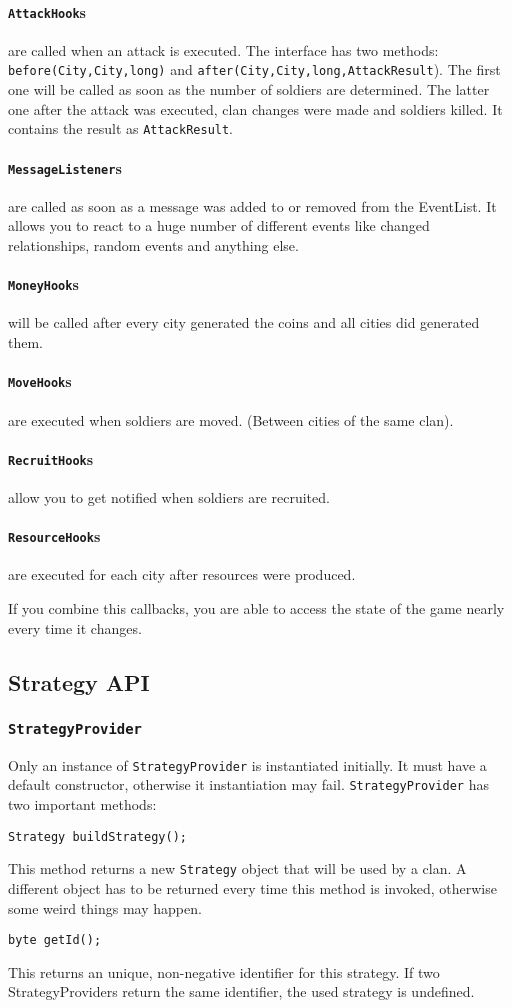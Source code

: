 \documentclass{article}
\begin{document}
\paragraph{\texttt{AttackHook}s} are called when an attack is executed. The interface has two methods: \texttt{before(City,City,long)} and \texttt{after(City,City,long,AttackResult}). The first one will
be called as soon as the number of soldiers are determined. The latter one after the attack was executed, clan changes were made and soldiers killed. It contains the result as \texttt{AttackResult}.
\paragraph{\texttt{MessageListener}s} are called as soon as a message was added to or removed from the EventList. It allows you to react to a huge number of different events like changed relationships, random events and anything else.
\paragraph{\texttt{MoneyHook}s} will be called after every city generated the coins and all cities did generated them.
\paragraph{\texttt{MoveHook}s} are executed when soldiers are moved. (Between cities of the same clan).  
\paragraph{\texttt{RecruitHook}s} allow you to get notified when soldiers are recruited.
\paragraph{\texttt{ResourceHook}s} are executed for each city after resources were produced.\newline

If you combine this callbacks, you are able to access the state of the game nearly every time it changes.
\subsection{Strategy API}
\subsubsection{\texttt{StrategyProvider}}
Only an instance of \texttt{StrategyProvider} is instantiated initially. It must have a default constructor, otherwise it instantiation may fail. \texttt{StrategyProvider} has two important methods:
\begin{verbatim}
Strategy buildStrategy();
\end{verbatim}
This method returns a new \texttt{Strategy} object that will be used by a clan. A different object has to be returned every time this method is invoked, otherwise some weird things may happen.
\begin{verbatim}
byte getId();
\end{verbatim}
This returns an unique, non-negative identifier for this strategy. If two StrategyProviders return the same identifier, the used strategy is undefined.
\end{document}

